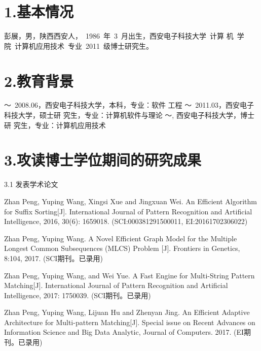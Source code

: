 
\begin{resume}

\section*{1.\hspace{0.75em}基本情况}
彭展，男，陕西西安人，~1986~年~3~月出生，西安电子科技大学~计算
机~学院~计算机应用技术~专业~2011~级博士研究生。
\section*{2.\hspace{0.75em}教育背景}
\begin{resumelist*}
  ～~2008.06，西安电子科技大学，本科，专业：软件
  工程
  ～~2011.03，西安电子科技大学，硕士研
  究生，专业：计算机软件与理论
  ～\hspace{3.5em}, 西安电子科技大学，博士研
  究生，专业：计算机应用技术
\end{resumelist*}

\section*{3.\hspace{0.75em}攻读博士学位期间的研究成果}
\begin{resumelist}{\hspace{-0.25em}3.1\hspace{0.5em} 发表学术论文}

  \resumelistitem Zhan Peng, Yuping Wang, Xingsi Xue and Jingxuan
  Wei. An Efficient Algorithm for Suffix Sorting[J]. International
  Journal of Pattern Recognition and Artificial Intelligence, 2016,
  30(6): 1659018. (SCI:000381291500011, EI:20161702306022)

  \resumelistitem Zhan Peng, Yuping Wang. A Novel Efficient Graph
  Model for the Multiple Longest Common Subsequences (MLCS) Problem
  [J]. Frontiers in Genetics, 8:104, 2017. (SCI期刊。已录用)

  \resumelistitem Zhan Peng, Yuping Wang, and Wei Yue. A Fast Engine
  for Multi-String Pattern Matching[J]. International Journal of
  Pattern Recognition and Artificial Intelligence, 2017: 1750039.
  (SCI期刊。已录用)

  \resumelistitem Zhan Peng, Yuping Wang, Lijuan Hu and Zhenyan
  Jing. An Efficient Adaptive Architecture for Multi-pattern
  Matching[J]. Special issue on Recent Advances on Information Science
  and Big Data Analytic, Journal of Computers. 2017. (EI期刊。已录用)


\end{resumelist}
\end{resume}
